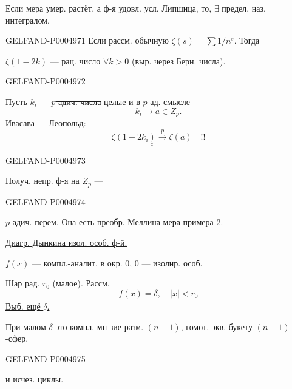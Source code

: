 Если мера умер. растёт, а ф-я удовл. усл. Липшица, то, $\exists$ предел, наз. интегралом.


\begin{GelfandAdjacentEvidence}{GELFAND-P000497}{1}
Если рассм. обычную $\zeta(s)=\sum 1/n^s$. Тогда

$\zeta(1-2k)$ — рац. число $\forall k>0$ (выр. через Берн. числа).

\end{GelfandAdjacentEvidence}
\begin{GelfandAdjacentEvidence}{GELFAND-P000497}{2}

Пусть $k_i$ — \sout{\mbox{$p$}-адич. числа} целые и в \mbox{$p$}-ад. смысле
\[
k_i\longrightarrow a\in Z_p.
\]
\uline{Ивасава — Леопольд}:
\[
\underline{\underline{\zeta(1-2k_i)\overset{p}{\longrightarrow}\zeta(a)}}\quad!!
\]
\end{GelfandAdjacentEvidence}
\begin{GelfandAdjacentEvidence}{GELFAND-P000497}{3}


Получ. непр. ф-я на $Z_p$ —
\end{GelfandAdjacentEvidence}
\begin{GelfandAdjacentEvidence}{GELFAND-P000497}{4}

$p$-адич. перем. Она есть преобр. Меллина мера примера 2.

 \uline{Диагр. Дынкина изол. особ. ф-й.}

$f(x)$ — компл.-аналит. в окр. $0$, $0$ — изолир. особ.

Шар рад. $r_0$ (малое). Рассм.
\[
\underline{f(x)=\delta,\quad |x|<r_0}
\]
\uline{Выб. ещё \mbox{$\delta$}.}

При малом $\delta$ это компл. мн-зие разм. $(n-1)$, гомот. экв. букету $(n-1)$-сфер.
\end{GelfandAdjacentEvidence}
\begin{GelfandAdjacentEvidence}{GELFAND-P000497}{5}


и исчез. циклы.
\end{GelfandAdjacentEvidence}



